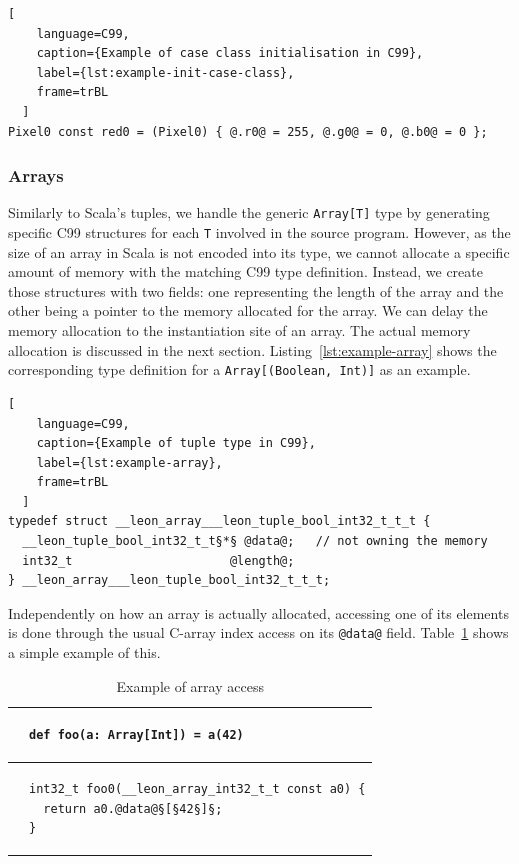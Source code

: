 \documentclass{article}
\newcommand{\inlineC}[1]{\lstinline[language=C99]|#1|}
\newcommand{\inlineScala}[1]{\lstinline[language=MyScala]|#1|}
\newcommand{\vheading}[1]{\rotatebox[origin=c]{90}{~\textbf{#1}~}}
\begin{document}
\begin{lstlisting}[
    language=C99,
    caption={Example of case class initialisation in C99},
    label={lst:example-init-case-class},
    frame=trBL
  ]
Pixel0 const red0 = (Pixel0) { @.r0@ = 255, @.g0@ = 0, @.b0@ = 0 };
\end{lstlisting}



\subsubsection{Arrays}
\label{sec:arrays}

Similarly to Scala's tuples, we handle the generic \inlineScala{Array[T]} type
by generating specific C99 structures for each \inlineScala{T} involved in the
source program. However, as the size of an array in Scala is not encoded into
its type, we cannot allocate a specific amount of memory with the matching C99
type definition. Instead, we create those structures with two fields: one
representing the length of the array and the other being a pointer to the memory
allocated for the array. We can delay the memory allocation to the instantiation
site of an array. The actual memory allocation is discussed in the next section.
Listing~\ref{lst:example-array} shows the corresponding type definition for a
\inlineScala{Array[(Boolean, Int)]} as an example.

\begin{lstlisting}[
    language=C99,
    caption={Example of tuple type in C99},
    label={lst:example-array},
    frame=trBL
  ]
typedef struct __leon_array___leon_tuple_bool_int32_t_t_t {
  __leon_tuple_bool_int32_t_t§*§ @data@;   // not owning the memory
  int32_t                      @length@;
} __leon_array___leon_tuple_bool_int32_t_t_t;
\end{lstlisting}

Independently on how an array is actually allocated, accessing one of its
elements is done through the usual C-array index access on its \inlineC{@data@}
field. Table~\ref{tab:example-array-access} shows a simple example of this.

\begin{table}[h]
  \centering
  \begin{tabular}{@{} c || l}
    \toprule

    \vheading{Scala} &
    \begin{lstlisting}[language=MyScala]
def foo(a: Array[Int]) = a(42)
    \end{lstlisting} \\

    \midrule

    \vheading{C99} &
    \begin{lstlisting}[language=C99]
int32_t foo0(__leon_array_int32_t_t const a0) {
  return a0.@data@§[§42§]§;
}
    \end{lstlisting} \\

    \bottomrule
  \end{tabular}
  \caption{Example of array access}
  \label{tab:example-array-access}
\end{table}
\end{document}

